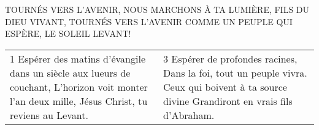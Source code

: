TOURNÉS VERS L’AVENIR,
NOUS MARCHONS À TA LUMIÈRE,
FILS DU DIEU VIVANT,
TOURNÉS VERS L’AVENIR
COMME UN PEUPLE QUI ESPÈRE,
LE SOLEIL LEVANT!

\begin{tabular}{p{} p{}}
1
Espérer des matins d’évangile \newline
dans un siècle aux lueurs de couchant, \newline
L’horizon voit monter l’an deux mille, \newline
Jésus Christ, tu reviens au Levant. \newline
&
3
Espérer de profondes racines, \newline
Dans la foi, tout un peuple vivra. \newline
Ceux qui boivent à ta source divine \newline
Grandiront en vrais fils d’Abraham. \newline
\end{tabular}

